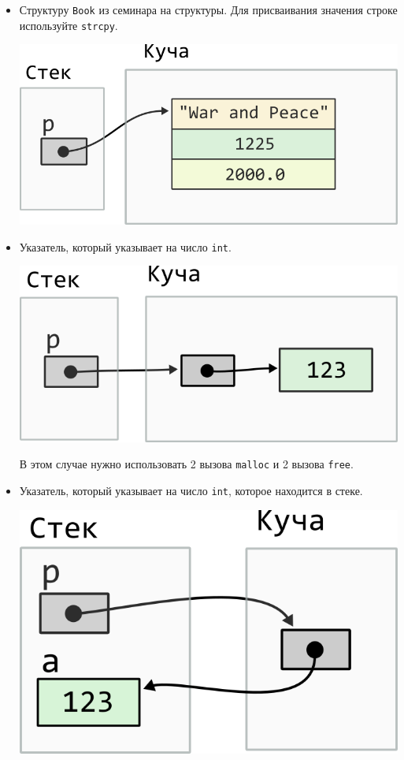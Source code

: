 \documentclass{article}
\begin{document}
\begin{itemize}
\item Структуру \texttt{Book} из семинара на структуры. Для присваивания значения строке используйте \texttt{strcpy}.
\begin{center}
\includegraphics[scale=0.72]{../images/malloc_class_tasks/heap_struct_book.png}
\end{center}


\item Указатель, который указывает на число \texttt{int}.
\begin{center}
\includegraphics[scale=0.72]{../images/malloc_class_tasks/heap_pointer_int.png}
\end{center}
В этом случае нужно использовать 2 вызова \texttt{malloc} и 2 вызова \texttt{free}.

\newpage
\item Указатель, который указывает на число \texttt{int}, которое находится в стеке.
\begin{center}
\includegraphics[scale=0.72]{../images/malloc_class_tasks/heap_pointer_int_stack.png}
\end{center}


\end{itemize}
\end{document}
